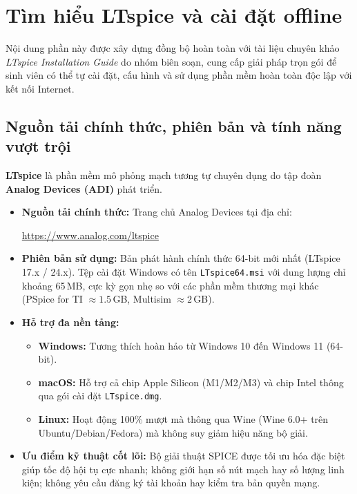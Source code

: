 \documentclass[12pt,a4paper]{article}
\begin{document}
\section{Tìm hiểu LTspice và cài đặt offline}

Nội dung phần này được xây dựng đồng bộ hoàn toàn với tài liệu chuyên khảo \textit{LTspice Installation Guide} do nhóm biên soạn, cung cấp giải pháp trọn gói để sinh viên có thể tự cài đặt, cấu hình và sử dụng phần mềm hoàn toàn độc lập với kết nối Internet.

\subsection{Nguồn tải chính thức, phiên bản và tính năng vượt trội}
\textbf{LTspice} là phần mềm mô phỏng mạch tương tự chuyên dụng do tập đoàn \textbf{Analog Devices (ADI)} phát triển.
\begin{itemize}[itemsep=2pt]
  \item \textbf{Nguồn tải chính thức:} Trang chủ Analog Devices tại địa chỉ:
  \begin{center}
    \url{https://www.analog.com/ltspice}
  \end{center}
  \item \textbf{Phiên bản sử dụng:} Bản phát hành chính thức 64-bit mới nhất (LTspice 17.x / 24.x). Tệp cài đặt Windows có tên \texttt{LTspice64.msi} với dung lượng chỉ khoảng 65\,MB, cực kỳ gọn nhẹ so với các phần mềm thương mại khác (PSpice for TI $\approx 1.5$\,GB, Multisim $\approx 2$\,GB).
  \item \textbf{Hỗ trợ đa nền tảng:}
  \begin{itemize}
    \item \textbf{Windows:} Tương thích hoàn hảo từ Windows 10 đến Windows 11 (64-bit).
    \item \textbf{macOS:} Hỗ trợ cả chip Apple Silicon (M1/M2/M3) và chip Intel thông qua gói cài đặt \texttt{LTspice.dmg}.
    \item \textbf{Linux:} Hoạt động 100\% mượt mà thông qua Wine (Wine 6.0+ trên Ubuntu/Debian/Fedora) mà không suy giảm hiệu năng bộ giải.
  \end{itemize}
  \item \textbf{Ưu điểm kỹ thuật cốt lõi:} Bộ giải thuật SPICE được tối ưu hóa đặc biệt giúp tốc độ hội tụ cực nhanh; không giới hạn số nút mạch hay số lượng linh kiện; không yêu cầu đăng ký tài khoản hay kiểm tra bản quyền mạng.
\end{itemize}
\end{document}
